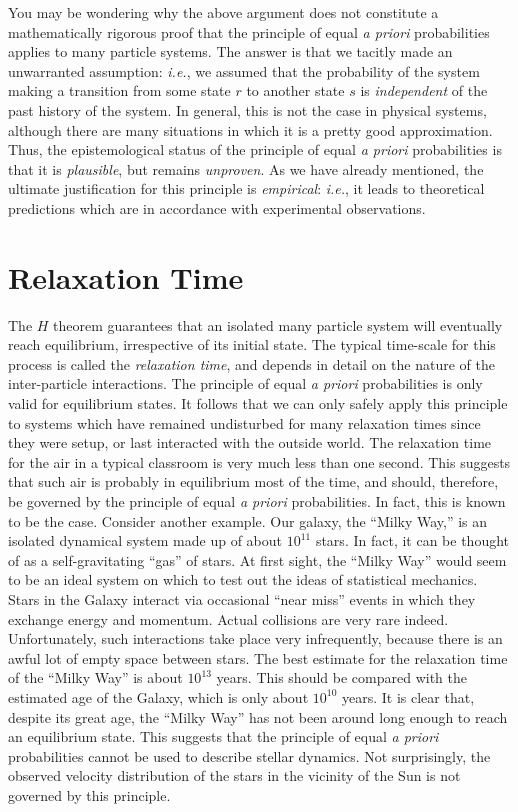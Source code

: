 You may be wondering why the above argument does not constitute a mathematically
rigorous proof that the principle of equal {\em a priori}\/ probabilities
applies to many particle systems. The answer is that we 
tacitly made an unwarranted
assumption: {\em i.e.}, we assumed 
that the probability of the system making a transition
from some state $r$ to another state $s$ is {\em  independent}\/ of the past history
of the system. In general, this is not the case in physical
systems, although there are many
situations in which it is a pretty good approximation. Thus, the
epistemological status of the principle of equal {\em a priori}\/ probabilities is that it
is {\em plausible}, but remains {\em unproven}. As we have already mentioned,
the ultimate justification for this principle is {\em empirical}: {\em i.e.},
it leads to theoretical predictions which are in accordance with
experimental observations. 

\section{Relaxation Time}\label{s3.10}
The $H$ theorem guarantees that an isolated  many particle system will eventually
reach equilibrium, irrespective of its initial state.
The typical time-scale  for this process
 is called the {\em relaxation time}, and depends in detail on the nature 
 of the
inter-particle interactions. The principle of equal {\em a priori}\/ probabilities is
only valid for equilibrium states. It follows that we can only safely apply this
principle to systems which have remained undisturbed for many relaxation times
since they were  setup, or last interacted with the outside world.
The relaxation time for the air in a typical classroom is
 very much less than one second. This suggests that such air is probably in
equilibrium most of the time, and should, therefore, be governed by the
principle of  equal {\em a priori}\/ probabilities. In fact, this is known
to be the case. Consider another example. Our galaxy, the ``Milky Way,'' is
an isolated  dynamical system made up of about $10^{11}$ stars. In fact, 
it can be thought
of as a self-gravitating ``gas'' of stars. At first sight, the 
``Milky Way'' 
would seem  to be an ideal system on which 
to test out the ideas of statistical mechanics. 
Stars in the Galaxy interact via occasional ``near miss'' events in which they
exchange energy and momentum. Actual collisions are very rare indeed. Unfortunately,
such interactions take place very infrequently, because 
there is an awful lot of empty space between stars. The best estimate for the
relaxation time of the ``Milky Way'' is about $10^{13}$ years. 
This should be compared with the estimated age of the Galaxy, which is only
about $10^{10}$ years. It is clear that, despite its great age, the ``Milky Way''
has not been around long enough to reach an equilibrium
state. This suggests that
the principle of equal {\em a priori}\/ probabilities cannot be used to 
describe stellar dynamics. Not surprisingly, the observed velocity distribution
of the stars in the vicinity of the Sun is not governed by this principle.

